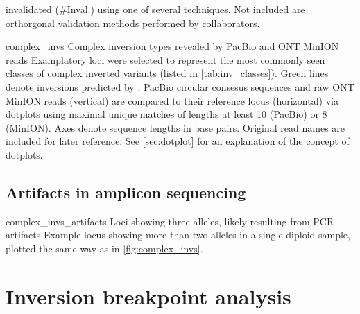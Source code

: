 \begin{table}[ht]
\begin{adjustbox}{inner,minipage=[b]{\textplusmargin}}
\begin{minipage}[t]{0.54\textplusmargin}
{                invalidated (\#Inval.) using one of several techniques.
                Not included are orthorgonal validation methods performed by
                collaborators.}
            \end{minipage}
            \hspace{0.04\textplusmargin}
            \begin{minipage}[t]{0.42\textplusmargin}
                \centering
            \end{minipage}
        \end{adjustbox}
\end{table}





    {complex_invs}
    {Complex inversion types revealed by PacBio and ONT MinION reads}
    {Examplatory loci were selected to represent the most commonly seen
    classes of complex inverted variants (listed in \cref{tab:inv_classes}).
    Green lines denote inversions predicted by \delly. PacBio circular
    consesus sequences and raw ONT MinION reads (vertical) are compared to their
    reference locus (horizontal) via dotplots using maximal unique matches
    of lengths at least 10 (PacBio) or 8 (MinION). Axes denote sequence lengths
    in base pairs. Original read names are included for later reference. See
    \cref{sec:dotplot} for an explanation of the concept of dotplots.}


\subsection{Artifacts in amplicon sequencing}
\label{sec:complex_invs_artifacts}


    {complex_invs_artifacts}
    {Loci showing three alleles, likely resulting from PCR artifacts}
    {Example locus showing more than two alleles in a single diploid sample,
    plotted the same way as in \cref{fig:complex_invs}.}



\section{Inversion breakpoint analysis}
